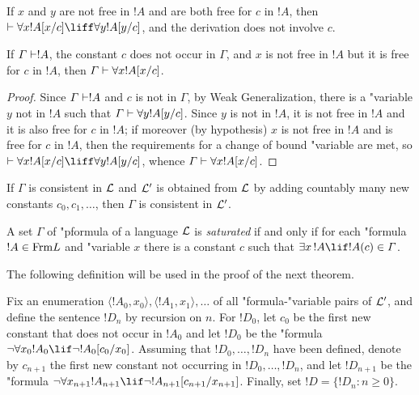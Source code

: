 \documentclass[../../include/open-logic-section]{subfiles}
\begin{document}

\begin{prop}
If $x$ and $y$ are not free in $!A$ and are both free for $c$ in $!A$,
then $\Proves \lforall[x] !A[x/c] \liff \lforall[y] !A[y/c]$, and the
derivation does not involve $c$.
\end{prop}

\begin{thm}
If $\Gamma \Proves !A$, the constant $c$ does not occur in $\Gamma$,
and $x$ is not free in $!A$ but it is free for $c$ in $!A$, then
$\Gamma \Proves \lforall[x] !A[x/c]$.
\end{thm}

\begin{proof}
Since $\Gamma \Proves !A$ and $c$ is not in $\Gamma$, by Weak
Generalization, there is a "{variable} $y$ not in $!A$ such that $\Gamma
\Proves \lforall[y] !A [y/c]$.  Since $y$ is not in $!A$, it is not
free in $!A$ and it is also free for $c$ in $!A$; if moreover (by
hypothesis) $x$ is not free in $!A$ and is free for $c$ in $!A$, then
the requirements for a change of bound "{variable} are met, so $\Proves
\lforall[x] !A[x/c] \liff \lforall[y] !A[y/c]$, whence $\Gamma \Proves
\lforall[x] !A[x/c]$.
\end{proof}

\begin{lem}
If $\Gamma$ is consistent in $\mathcal L$ and $\mathcal L'$ is obtained from
$\mathcal L$ by adding countably many new constants $c_0, c_1, \dots$,
then $\Gamma$ is consistent in $\mathcal L'$.
\end{lem}

\begin{defn}
  A set $\Gamma$ of "p{formula} of a language $\mathcal L$ is
  \emph{saturated} if and only if for each "{formula} $!A \in
  \Frm {L}$ and "{variable} $x$ there is a constant $c$ such that
  $\lexists[x][!A] \lif !A(c) \in \Gamma$.
\end{defn}


The following definition will be used in the proof of the next theorem.

\begin{defn}
Fix an enumeration $\langle !A_0, x_0 \rangle, \langle !A_1, x_1
\rangle, \dots$ of all "{formula}-"{variable} pairs of $\mathcal L'$, and
define the sentence $!D_n$ by recursion on $n$. For $!D_0$,
let $c_0$ be the first new constant that does not occur in $!A_0$ and
let $!D_0$ be the "{formula} $\lnot \lforall[x_0] !A_0 \lif \lnot
!A_0[c_0/x_0]$. Assuming that $!D_0, \dots, !D_n$ have been
defined, denote by $c_{n+1}$ the first new constant not occurring in
$!D_0, \dots, !D_n$, and let $!D_{n+1}$ be the "{formula}
$\lnot \lforall[x_{n+1}] !A_{n+1} \lif \lnot
!A_{n+1}[c_{n+1}/x_{n+1}]$. Finally, set $!D = \{ !D_n : n
\geq 0 \}$.
\end{defn}
\end{document}
